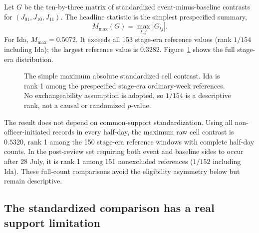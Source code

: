 \documentclass[11pt]{article}
\begin{document}
Let $G$ be the ten-by-three matrix of standardized event-minus-baseline contrasts for $(J_{01},J_{10},J_{11})$. The headline statistic is the simplest prespecified summary,
\begin{equation}
M_{\max}(G)=\max_{t,j}|G_{tj}|.
\end{equation}
For Ida, $M_{\max}=0.5072$. It exceeds all 153 stage-era reference values (rank $1/154$ including Ida); the largest reference value is $0.3282$. Figure~\ref{fig:rank} shows the full stage-era distribution.

\begin{figure}[t]
\centering
{}
\caption{The simple maximum absolute standardized cell contrast. Ida is rank 1 among the prespecified stage-era ordinary-week references. No exchangeability assumption is adopted, so $1/154$ is a descriptive rank, not a causal or randomized $p$-value.}
\label{fig:rank}
\end{figure}

The result does not depend on common-support standardization. Using all non-officer-initiated records in every half-day, the maximum raw cell contrast is $0.5320$, rank 1 among the 150 stage-era reference windows with complete half-day counts. In the post-review set requiring both event and baseline sides to occur after 28 July, it is rank 1 among 151 nonexcluded references ($1/152$ including Ida). These full-count comparisons avoid the eligibility asymmetry below but remain descriptive.

\subsection{The standardized comparison has a real support limitation}
\end{document}
